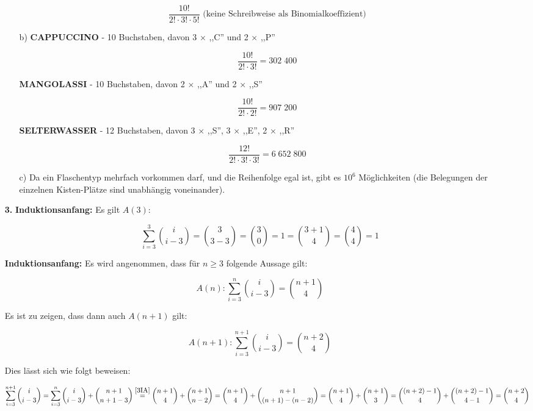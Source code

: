 \documentclass[a4paper,10pt]{scrartcl}
\begin{document}
\begin{enumerate}
\begin{enumerate}
                $$\frac{10!}{2! \cdot 3! \cdot 5!} \text{ (keine Schreibweise als Binomialkoeffizient)}$$

            \item[b)]
                \textbf{CAPPUCCINO} - 10 Buchstaben, davon 3 $\times$ ,,C'' und 2 $\times$ ,,P''

                $$\frac{10!}{2! \cdot 3!} = 302\;400$$

                \textbf{MANGOLASSI} - 10 Buchstaben, davon 2 $\times$ ,,A'' und 2 $\times$ ,,S''

                $$\frac{10!}{2! \cdot 2!} = 907\;200$$

                \textbf{SELTERWASSER} - 12 Buchstaben, davon 3 $\times$ ,,S'', 3 $\times$ ,,E'', 2 $\times$ ,,R''

                $$\frac{12!}{2! \cdot 3! \cdot 3!} = 6\;652\;800$$

            \item[c)]
                Da ein Flaschentyp mehrfach vorkommen darf, und die Reihenfolge egal ist, gibt es $10^6$ Möglichkeiten
                (die Belegungen der einzelnen Kisten-Plätze sind unabhängig voneinander).
        \end{enumerate}
    \newpage

    \item[\textbf{3.}]
        \textbf{Induktionsanfang:} Es gilt $A(3):$

            $$\sum_{i=3}^{3} \binom{i}{i-3} = \binom{3}{3 - 3} = \binom{3}{0} = 1 = \binom{3+1}{4} = \binom{4}{4} = 1$$

        \textbf{Induktionsanfang:}
            Es wird angenommen, dass für $n \geq 3$ folgende Aussage gilt:

            \begin{equation}\label{3IA}\tag{IA}
                A(n): \sum_{i=3}^{n} \binom{i}{i-3} = \binom{n+1}{4}
            \end{equation}

            Es ist zu zeigen, dass dann auch $A(n+1)$ gilt:

            \begin{equation}\label{3IS1}
                A(n+1): \sum_{i=3}^{n + 1} \binom{i}{i-3} = \binom{n+2}{4}
            \end{equation}

            Dies lässt sich wie folgt beweisen:

            \begin{dmath*}
                \sum_{i=3}^{n + 1} \binom{i}{i-3}
                = \sum_{i=3}^{n} \binom{i}{i-3} + \binom{n + 1}{n + 1 - 3}
                \overset{\eqref{3IA}}{=} \binom{n + 1}{4} + \binom{n + 1}{n - 2}
                = \binom{n + 1}{4} + \binom{n + 1}{(n + 1) - (n - 2)}
                = \binom{n + 1}{4} + \binom{n + 1}{3}
                = \binom{(n + 2) - 1}{4} + \binom{(n + 2) - 1}{4 - 1}
                = \binom{n + 2}{4}
            \end{dmath*}


\end{enumerate}
\end{document}
